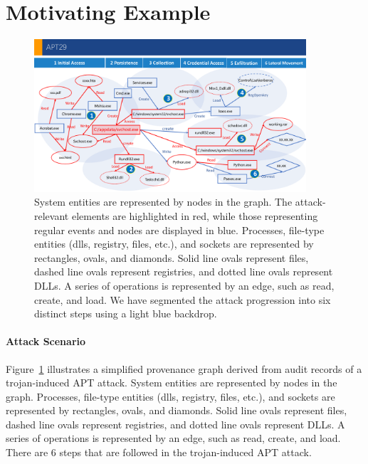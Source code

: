 \section{Motivating Example}
\label{sec:motivation}

\begin{figure}[ht]
    \centering
    \includegraphics[width=0.9\textwidth]{figs/example.pdf}
    \caption{ 
    System entities are represented by nodes in the graph. 
    The attack-relevant elements are highlighted in red, while those representing regular events and nodes are displayed in blue.
    Processes, file-type entities (dlls, registry, files, etc.), and sockets are represented by rectangles, ovals, and diamonds. Solid line ovals represent files, dashed line ovals represent registries, and dotted line ovals represent DLLs. A series of operations is represented by an edge, such as read, create, and load. We have segmented the attack progression into six distinct steps using a light blue backdrop. }
    \label{fig-example}
    \end{figure}

\paragraph{Attack Scenario}
Figure~\ref{fig-example} illustrates a simplified provenance graph derived from audit records of a trojan-induced APT attack. System entities are represented by nodes in the graph. 
Processes, file-type entities (dlls, registry, files, etc.), and sockets are represented by rectangles, ovals, and diamonds. Solid line ovals represent files, dashed line ovals represent registries, and dotted line ovals represent DLLs.
A series of operations is represented by an edge, such as read, create, and load.
There are 6 steps that are followed in the trojan-induced APT attack.


